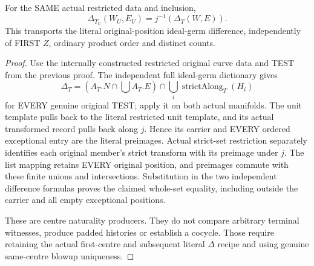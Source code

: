 \begin{theorem}
\label{hir:sharp-original-curve-literal-difference-open-restriction}
\leanok
For the SAME actual restricted data and inclusion,
\[
 \Delta_{T_U}(W_U,E_U)=j^{-1}(\Delta_T(W,E)).
\]
This transports the literal original-position ideal-germ difference,
independently of FIRST $Z$, ordinary product order and distinct counts.
\end{theorem}
\begin{proof}
Use the internally constructed restricted original curve data and TEST
from the previous proof. The independent full ideal-germ dictionary gives
\[
 \Delta_T=(A_T.N\cap\bigcup A_T.E)\cap
               \bigcup_i\operatorname{strictAlong}_T(H_i)
\]
for EVERY genuine original TEST; apply it on both actual manifolds. The
unit template pulls back to the literal restricted unit template, and
its actual transformed record pulls back along $j$. Hence its carrier
and EVERY ordered exceptional entry are the literal preimages. Actual
strict-set restriction separately identifies each original member's
strict transform with its preimage under $j$. The list mapping retains
EVERY original position, and preimages commute with these finite unions
and intersections. Substitution in the two independent difference
formulas proves the claimed whole-set equality, including outside the
carrier and all empty exceptional positions.

These are centre naturality producers. They do not compare arbitrary
terminal witnesses, produce padded histories or establish a cocycle.
Those require retaining the actual first-centre and subsequent literal
$\Delta$ recipe and using genuine same-centre blowup uniqueness.
\end{proof}
